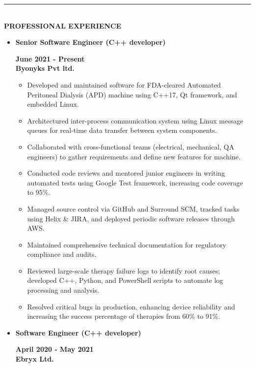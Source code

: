 \documentclass[10pt,a4paper]{article}
\newcommand{\MyHorizontalLine}{\noindent\rule{\linewidth}{1.5pt}\\}
\begin{document}
\MyHorizontalLine
	\textbf{PROFESSIONAL EXPERIENCE}
	\begin{itemize}
		\item \raggedleft\textbf{Senior Software Engineer (C++ developer)}
		\hfill
		\raggedright\textbf{June 2021 - Present}\\
		\textbf{Byonyks Pvt ltd.}
		\begin{itemize}
		\item Developed and maintained software for FDA-cleared Automated Peritoneal Dialysis (APD) machine using C++17, Qt framework, and embedded Linux.
		\item Architectured inter-process communication system using Linux message queues for real-time data transfer between system components.
		\item Collaborated with cross-functional teams (electrical, mechanical, QA engineers) to gather requirements and define new features for machine.
		\item Conducted code reviews and mentored junior engineers in writing automated tests using Google Test framework, increasing code coverage to 95\%.
		\item Managed source control via GitHub and Surround SCM, tracked tasks using Helix \& JIRA, and deployed periodic software releases through AWS.
		\item Maintained comprehensive technical documentation for regulatory compliance and audits.
		\item Reviewed large-scale therapy failure logs to identify root causes; developed C++, Python, and PowerShell scripts to automate log processing and analysis.
		\item Resolved critical bugs in production, enhancing device reliability and increasing the success percentage of therapies from 60\% to 91\%.
		\end{itemize}

		\item \raggedleft\textbf{Software Engineer (C++ developer)}
		\hfill
		\raggedright\textbf{April 2020 - May 2021}\\
		\textbf{Ebryx Ltd.}\\
		

\end{itemize}
\end{document}
